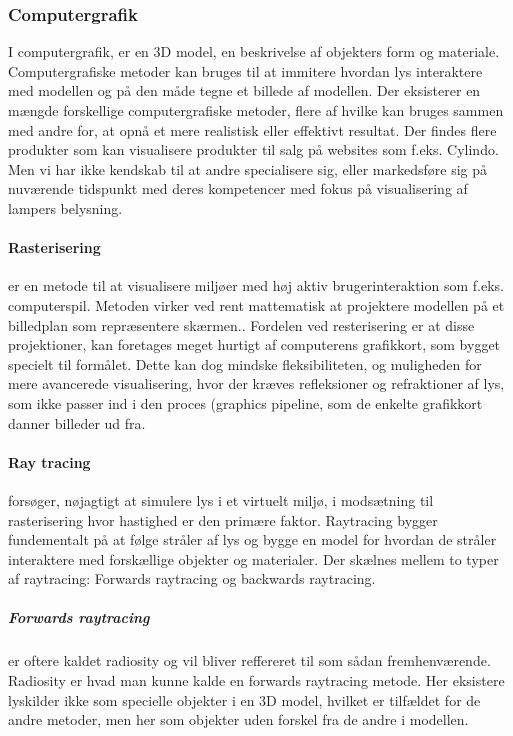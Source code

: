 \subsubsection{Computergrafik}
\label{sec:computergrafik}
I computergrafik, er en 3D model, en beskrivelse af objekters form og materiale.\cite{computergrafik_introduktion} Computergrafiske metoder kan bruges til at immitere hvordan lys interaktere med modellen og på den måde tegne et billede af modellen. Der eksisterer en mængde forskellige computergrafiske metoder, flere af hvilke kan bruges sammen med andre for, at opnå et mere realistisk eller effektivt resultat. Der findes flere produkter som kan visualisere produkter til salg på websites som f.eks. Cylindo\cite{Cylindo}. Men vi har ikke kendskab til at andre specialisere sig, eller markedsføre sig på nuværende tidspunkt med deres kompetencer med fokus på visualisering af lampers belysning.

\paragraph{Rasterisering}
er en metode til at visualisere miljøer med høj aktiv brugerinteraktion som f.eks. computerspil.\cite{rastarization} Metoden virker ved rent mattematisk at projektere modellen på et billedplan som repræsentere skærmen.\cite{rastarization}. Fordelen ved resterisering er at disse projektioner, kan foretages meget hurtigt af computerens grafikkort, som bygget specielt til formålet\cite{rastarization}. Dette kan dog mindske fleksibiliteten, og muligheden for mere avancerede visualisering, hvor der kræves refleksioner og refraktioner af lys, som ikke passer ind i den proces (graphics pipeline\cite{rastarization}, som de enkelte grafikkort danner billeder ud fra. 

\paragraph{Ray tracing}\cite{raytracing_for_begyndere} forsøger, nøjagtigt at simulere lys i et virtuelt miljø, i modsætning til rasterisering hvor hastighed er den primære faktor. Raytracing bygger fundementalt på at følge stråler af lys og bygge en model for hvordan de stråler interaktere med forskællige objekter og materialer. Der skælnes mellem to typer af raytracing: Forwards raytracing og backwards raytracing.

\subparagraph{Forwards raytracing}\cite{radiosity_by_wpi,radiosity_by_uob} er oftere kaldet radiosity og vil bliver reffereret til som sådan fremhenværende. Radiosity er hvad man kunne kalde en forwards raytracing metode. Her eksistere lyskilder ikke som specielle objekter i en 3D model, hvilket er tilfældet for de andre metoder, men her som objekter uden forskel fra de andre i modellen.

